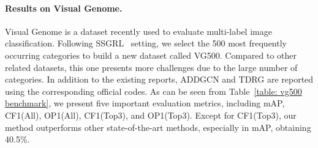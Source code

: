 \documentclass{ecai}
\begin{document}
\paragraph{Results on Visual Genome.}
Visual Genome is a dataset recently used to evaluate multi-label image classification.
Following SSGRL~\cite{Chen2019ICCV} setting, we select the 500 most frequently occurring categories to build a new dataset called VG500.
Compared to other related datasets, this one presents more challenges due to the large number of categories.
In addition to the existing reports, ADDGCN and TDRG are reported using the corresponding official codes.
As can be seen from Table~\ref{table: vg500 benchmark}, we present five important evaluation metrics, including mAP, CF1(All), OP1(All), CF1(Top3), and OP1(Top3).
Except for CF1(Top3), our method outperforms other state-of-the-art methods, especially in mAP, obtaining 40.5\%.
\begin{table}
	\caption{Comparisons with state-of-the-art methods on the VG500 dataset. \emph{*} indicates the reproduced results of our implementation.}
\label{table: vg500 benchmark}
\end{table} 
\end{document}
